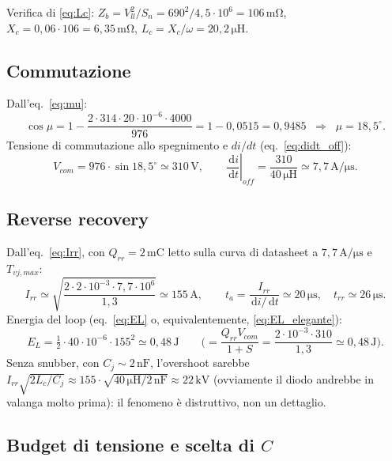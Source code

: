 \documentclass[11pt,a4paper]{article}
\newcommand{\ud}{\,\mathrm{d}}
\newcommand{\unit}[1]{\,\mathrm{#1}}
\begin{document}
Verifica di \eqref{eq:Lc}:
$Z_b = V_{ll}^2/S_n = 690^2/4{,}5\cdot10^6 = 106\unit{m\Omega}$,
$X_c = 0{,}06 \cdot 106 = 6{,}35\unit{m\Omega}$,
$L_c = X_c/\omega = 20{,}2\unit{\mu H}$.

\subsection{Commutazione}

Dall'eq.~\eqref{eq:mu}:
\begin{equation}
\cos\mu = 1 - \frac{2\cdot 314 \cdot 20\cdot10^{-6}\cdot 4000}{976}
        = 1 - 0{,}0515 = 0{,}9485
\;\;\Rightarrow\;\; \mu = 18{,}5^\circ .
\end{equation}
Tensione di commutazione allo spegnimento e $di/dt$
(eq.~\ref{eq:didt_off}):
\begin{equation}
V_{com} = 976 \cdot \sin 18{,}5^\circ \simeq 310\unit{V},
\qquad
\left.\frac{\ud i}{\ud t}\right|_{off}
= \frac{310}{40\unit{\mu H}} \simeq 7{,}7\unit{A/\mu s}.
\end{equation}

\subsection{Reverse recovery}

Dall'eq.~\eqref{eq:Irr}, con $Q_{rr}=2\unit{mC}$ letto sulla curva di
datasheet a $7{,}7\unit{A/\mu s}$ e $T_{vj,max}$:
\begin{equation}
I_{rr} \simeq \sqrt{\frac{2 \cdot 2\cdot10^{-3}\cdot 7{,}7\cdot10^{6}}{1{,}3}}
\simeq 155\unit{A},
\qquad
t_a = \frac{I_{rr}}{\ud i/\ud t} \simeq 20\unit{\mu s},
\quad t_{rr} \simeq 26\unit{\mu s}.
\end{equation}
Energia del loop (eq.~\ref{eq:EL} o, equivalentemente,
\ref{eq:EL_elegante}):
\begin{equation}
E_L = \tfrac{1}{2}\cdot 40\cdot10^{-6}\cdot 155^2 \simeq 0{,}48\unit{J}
\qquad\Big(= \frac{Q_{rr} V_{com}}{1+S}
= \frac{2\cdot10^{-3}\cdot 310}{1{,}3} \simeq 0{,}48\unit{J}\Big).
\end{equation}
Senza snubber, con $C_j \sim 2\unit{nF}$, l'overshoot sarebbe
$I_{rr}\sqrt{2L_c/C_j} \approx 155\cdot\sqrt{40\,\mathrm{\mu H}/2\,\mathrm{nF}}
\approx 22\unit{kV}$ (ovviamente il diodo andrebbe in valanga molto
prima): il fenomeno \`e distruttivo, non un dettaglio.

\subsection{Budget di tensione e scelta di $C$}
\end{document}
